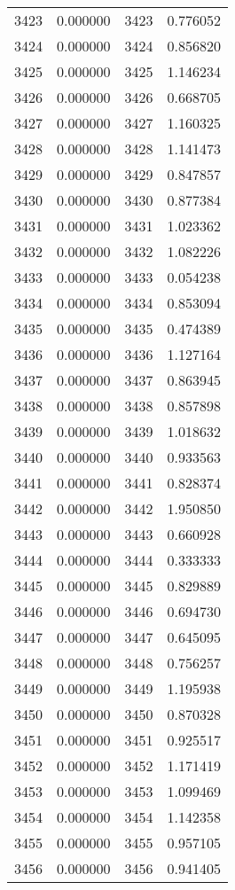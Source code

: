 \documentclass[12pt]{article}
\begin{document}
\begin{longtable}{@{}cccc@{}}
3423 & 0.000000 & 3423 & 0.776052 \\
3424 & 0.000000 & 3424 & 0.856820 \\
3425 & 0.000000 & 3425 & 1.146234 \\
3426 & 0.000000 & 3426 & 0.668705 \\
3427 & 0.000000 & 3427 & 1.160325 \\
3428 & 0.000000 & 3428 & 1.141473 \\
3429 & 0.000000 & 3429 & 0.847857 \\
3430 & 0.000000 & 3430 & 0.877384 \\
3431 & 0.000000 & 3431 & 1.023362 \\
3432 & 0.000000 & 3432 & 1.082226 \\
3433 & 0.000000 & 3433 & 0.054238 \\
3434 & 0.000000 & 3434 & 0.853094 \\
3435 & 0.000000 & 3435 & 0.474389 \\
3436 & 0.000000 & 3436 & 1.127164 \\
3437 & 0.000000 & 3437 & 0.863945 \\
3438 & 0.000000 & 3438 & 0.857898 \\
3439 & 0.000000 & 3439 & 1.018632 \\
3440 & 0.000000 & 3440 & 0.933563 \\
3441 & 0.000000 & 3441 & 0.828374 \\
3442 & 0.000000 & 3442 & 1.950850 \\
3443 & 0.000000 & 3443 & 0.660928 \\
3444 & 0.000000 & 3444 & 0.333333 \\
3445 & 0.000000 & 3445 & 0.829889 \\
3446 & 0.000000 & 3446 & 0.694730 \\
3447 & 0.000000 & 3447 & 0.645095 \\
3448 & 0.000000 & 3448 & 0.756257 \\
3449 & 0.000000 & 3449 & 1.195938 \\
3450 & 0.000000 & 3450 & 0.870328 \\
3451 & 0.000000 & 3451 & 0.925517 \\
3452 & 0.000000 & 3452 & 1.171419 \\
3453 & 0.000000 & 3453 & 1.099469 \\
3454 & 0.000000 & 3454 & 1.142358 \\
3455 & 0.000000 & 3455 & 0.957105 \\
3456 & 0.000000 & 3456 & 0.941405 \\

\end{longtable}
\end{document}
